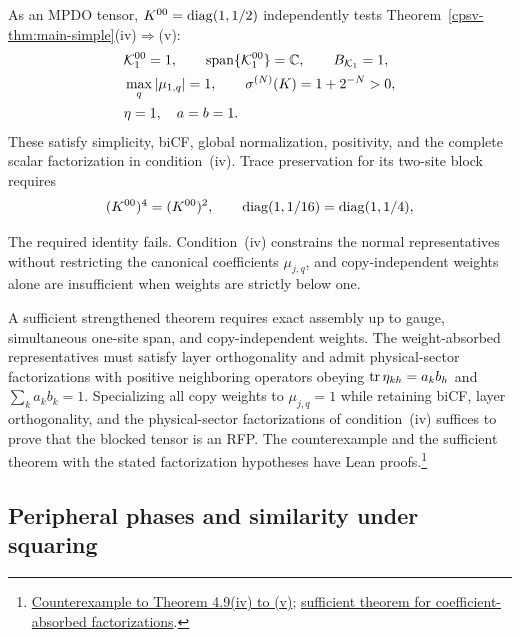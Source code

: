 \documentclass[aps,pra,reprint,nofootinbib,onecolumn]{revtex4-2}
\begin{document}
As an MPDO tensor, $K^{00}=\operatorname{diag}(1,1/2)$ independently tests
Theorem~\ref{cpsv-thm:main-simple}(iv)$\Rightarrow$(v):
\begin{align}
	 & \mathcal{K}_1^{00}=1,\qquad
	\operatorname{span}\{\mathcal{K}_1^{00}\}=\mathbb C,\qquad
	B_{\mathcal{K}_1}=1,\nonumber              \\
	 & \max_q|\mu_{1,q}|=1,\qquad
	\sigma^{(N)}(K)=1+2^{-N}>0,\nonumber \\
	 & \eta=1,\quad a=b=1.
	\label{eq:K00-props}
\end{align}
These satisfy simplicity, biCF, global normalization, positivity,
and the complete scalar factorization in condition~(iv).
Trace preservation for its two-site block requires
\begin{align}
	(K^{00})^4=(K^{00})^2,\qquad
	\operatorname{diag}(1,1/16)=\operatorname{diag}(1,1/4),
	\label{eq:K00-four-two}
\end{align}
\begin{refutation}
	The required identity fails. Condition~(iv) constrains the normal representatives without
	restricting the canonical coefficients $\mu_{j,q}$, and copy-independent
	weights alone are insufficient when weights are strictly below one.
\end{refutation}
A sufficient strengthened theorem requires exact assembly up to gauge,
simultaneous one-site span, and copy-independent weights. The weight-absorbed
representatives must satisfy layer orthogonality and admit physical-sector
factorizations with positive neighboring operators obeying
$\operatorname{tr}\eta_{kh}=a_kb_h$ and $\sum_k a_kb_k=1$. Specializing all copy weights to $\mu_{j,q}=1$ while retaining
biCF, layer orthogonality, and the physical-sector factorizations of condition~(iv)
suffices to prove that the blocked tensor is an RFP.
The counterexample and the sufficient theorem with the stated
factorization hypotheses have Lean proofs.\footnote{\href{https://sirui-lu.com/TNLean/docs/TNLean/MPS/MPDO/Theorem49RepeatedCopyCounterexample.html\#MPOTensor.CaseIIAbsorptionCounterexample.printed_theorem49_iv_to_v_is_false}{Counterexample to Theorem 4.9(iv) to (v)}; \href{https://sirui-lu.com/TNLean/docs/TNLean/MPS/MPDO/BNTFactorizationChannels.html\#MPOTensor.blockTwo_isRFPViaTS_of_bntLayerOrthogonal_of_physicalSectorFactorization_of_commonWeight}{sufficient theorem for coefficient-absorbed factorizations}.}

\subsection{Peripheral phases and similarity under squaring}
\end{document}
